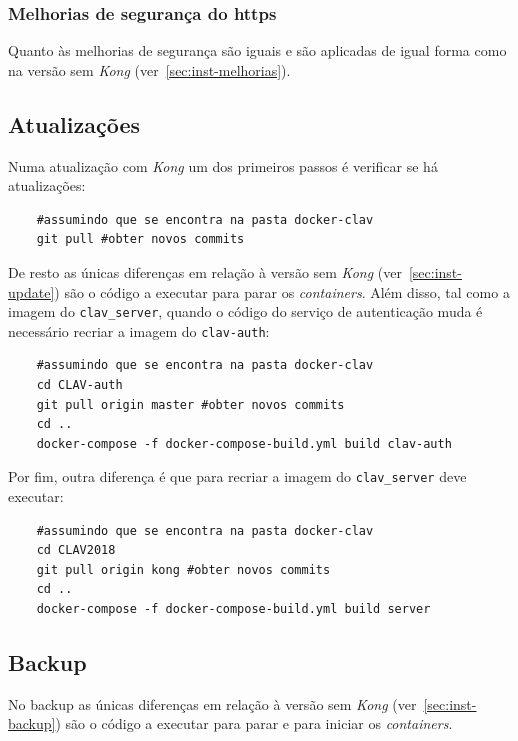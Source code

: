 \subsubsection{Melhorias de segurança do \acrshort{https}}

Quanto às melhorias de segurança são iguais e são aplicadas de igual forma como na versão sem \textit{Kong} (ver~\ref{sec:inst-melhorias}).

\subsection{Atualizações}

Numa atualização com \textit{Kong} um dos primeiros passos é verificar se há atualizações:
\footnotesize
\begin{verbatim}
    #assumindo que se encontra na pasta docker-clav
    git pull #obter novos commits
\end{verbatim}
\normalsize

De resto as únicas diferenças em relação à versão sem \textit{Kong} (ver~\ref{sec:inst-update}) são o código a executar para parar os \textit{containers}. Além disso, tal como a imagem do \texttt{clav\_server}, quando o código do serviço de autenticação muda é necessário recriar a imagem do \texttt{clav-auth}:

\footnotesize
\begin{verbatim}
    #assumindo que se encontra na pasta docker-clav
    cd CLAV-auth
    git pull origin master #obter novos commits
    cd ..
    docker-compose -f docker-compose-build.yml build clav-auth
\end{verbatim}
\normalsize

Por fim, outra diferença é que para recriar a imagem do \texttt{clav\_server} deve executar:

\footnotesize
\begin{verbatim}
    #assumindo que se encontra na pasta docker-clav
    cd CLAV2018
    git pull origin kong #obter novos commits
    cd ..
    docker-compose -f docker-compose-build.yml build server
\end{verbatim}
\normalsize

\subsection{Backup}

No backup as únicas diferenças em relação à versão sem \textit{Kong} (ver~\ref{sec:inst-backup}) são o código a executar para parar e para iniciar os \textit{containers}.

